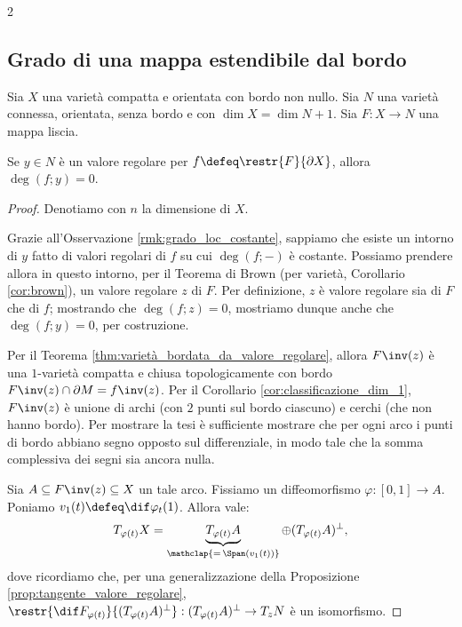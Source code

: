 \begin{multicols*}{2}
    \subsection{Grado di una mappa estendibile dal bordo}

    \begin{lemma} \label{lem:grado_mappa_estendibile}
        Sia $X$ una varietà compatta e orientata con bordo non nullo. Sia $N$
        una varietà connessa, orientata, senza bordo e con $\dim X = \dim N + 1$.
        Sia $F : X \to N$ una mappa liscia. \smallskip

        Se $y \in N$ è un valore regolare per $f \defeq \restr{F}{\partial X}$, allora
        $\deg(f; y) = 0$.
    \end{lemma}

    \begin{proof}
        Denotiamo con $n$ la dimensione di $X$. \smallskip

        Grazie all'Osservazione \ref{rmk:grado_loc_costante}, sappiamo che esiste un intorno
        di $y$ fatto di valori regolari di $f$ su cui $\deg(f; -)$ è costante. Possiamo prendere allora in questo intorno,
        per il Teorema di Brown (per varietà, Corollario \ref{cor:brown}), un valore regolare
        $z$ di $F$. Per definizione, $z$ è valore regolare sia di $F$ che di $f$; mostrando che
        $\deg(f; z) = 0$, mostriamo dunque anche che $\deg(f; y) = 0$, per costruzione. \smallskip

        Per il Teorema \ref{thm:varietà_bordata_da_valore_regolare}, allora $F\inv(z)$ è una $1$-varietà
        compatta e chiusa topologicamente con bordo $F\inv(z) \cap \partial M = f\inv(z)$. Per il
        Corollario \ref{cor:classificazione_dim_1}, $F\inv(z)$ è unione di archi (con $2$ punti sul bordo ciascuno)
        e cerchi (che non hanno bordo). Per mostrare la tesi è sufficiente mostrare che per ogni arco
        i punti di bordo abbiano segno opposto sul differenziale, in modo tale che la somma complessiva dei
        segni sia ancora nulla. \smallskip

        Sia $A \subseteq F\inv(z) \subseteq X$ un tale arco. Fissiamo un diffeomorfismo $\varphi : [0, 1] \to A$.
        Poniamo $v_1(t) \defeq \dif \varphi_t (1)$. Allora vale:
        \[
            T_{\varphi(t)} X = \underbrace{T_{\varphi(t)} A}_{\mathclap{=\, \Span(v_1(t))}} \oplus (T_{\varphi(t)} A)^\perp,
        \]
        dove ricordiamo che, per una generalizzazione della Proposizione \ref{prop:tangente_valore_regolare},
        $\restr{\dif F_{\varphi(t)}}{(T_{\varphi(t)} A)^\perp} : (T_{\varphi(t)} A)^\perp \to T_z N$ è un isomorfismo. \smallskip


\end{proof}
\end{multicols*}
